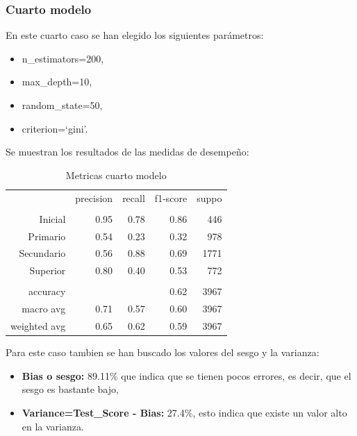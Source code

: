 \documentclass[a4paper]{article}
\begin{document}
        \subsubsection{Cuarto modelo}

            En este cuarto caso se han elegido los siguientes parámetros:
            \begin{itemize}
                \item n\_estimators=200,
                \item max\_depth=10,
                \item random\_state=50,
                \item criterion=`gini'.
            \end{itemize}

            Se muestran los resultados de las medidas de desempeño:
            \begin{table}[H]
                \centering
                \begin{tabular}{rrrrr}
                    ~ & precision & recall & f1-score & suppo \\
                    & & & & \\
                    Inicial    & 0.95 & 0.78 & 0.86 & 446 \\
                    Primario   & 0.54 & 0.23 & 0.32 & 978 \\
                    Secundario & 0.56 & 0.88 & 0.69 & 1771 \\
                    Superior   & 0.80 & 0.40 & 0.53 & 772 \\
                    & & & & \\
                    accuracy & & & 0.62 & 3967 \\
                    macro avg & 0.71 & 0.57 & 0.60 & 3967 \\
                    weighted avg & 0.65 & 0.62 & 0.59 & 3967 \\
                \end{tabular}
                \caption{Metricas cuarto modelo}
                \label{Fourth model metrics}
            \end{table}

            Para este caso tambien se han buscado los valores del sesgo y la varianza:
            \begin{itemize}
                \item \textbf{Bias o sesgo:} 89.11\% que indica que se tienen pocos errores, es decir, que el sesgo es bastante bajo,
                \item \textbf{Variance=Test\_Score - Bias:} 27.4\%, esto indica que existe un valor alto en la varianza.
             \end{itemize}
\end{document}
